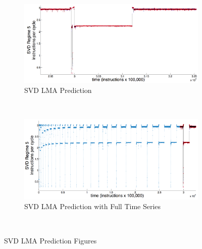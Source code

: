 \documentclass{article}
\begin{document}
\begin{figure}
        \centering
        \begin{subfigure}{\textwidth}
                \includegraphics[width=\textwidth]{figs/svdPrediction}
                \caption{SVD LMA Prediction}
                \label{fig:gull}
        \end{subfigure}%
        \newline
        ~ %
        \begin{subfigure}[b]{\textwidth}
                \includegraphics[width=\textwidth]{figs/svdPredictionFull}
                \caption{SVD LMA Prediction with Full Time Series}
                \label{fig:svdFullColored}
        \end{subfigure}
        ~ %
         \caption{SVD LMA Prediction Figures }\label{fig:svdFull}
\end{figure}
\end{document}
